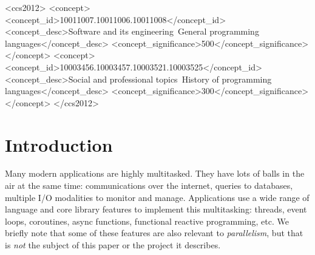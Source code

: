 \documentclass[sigplan,10pt,review,anonymous]{acmart}\settopmatter{printfolios=true,printccs=false,printacmref=false}
\begin{document}
\begin{CCSXML}
<ccs2012>
<concept>
<concept_id>10011007.10011006.10011008</concept_id>
<concept_desc>Software and its engineering~General programming languages</concept_desc>
<concept_significance>500</concept_significance>
</concept>
<concept>
<concept_id>10003456.10003457.10003521.10003525</concept_id>
<concept_desc>Social and professional topics~History of programming languages</concept_desc>
<concept_significance>300</concept_significance>
</concept>
</ccs2012>
\end{CCSXML}




\maketitle




\section{Introduction}

Many modern applications are highly multitasked.
They have lots of balls in the air at the same time: communications over the internet, queries to databases, multiple I/O modalities to monitor and manage.
Applications use a wide range of language and core library features to implement this multitasking: threads, event loops, coroutines, async functions, functional reactive programming, etc.
We briefly note that some of these features are also relevant to \emph{parallelism}, but that is \emph{not} the subject of this paper or the project it describes.
\end{document}
